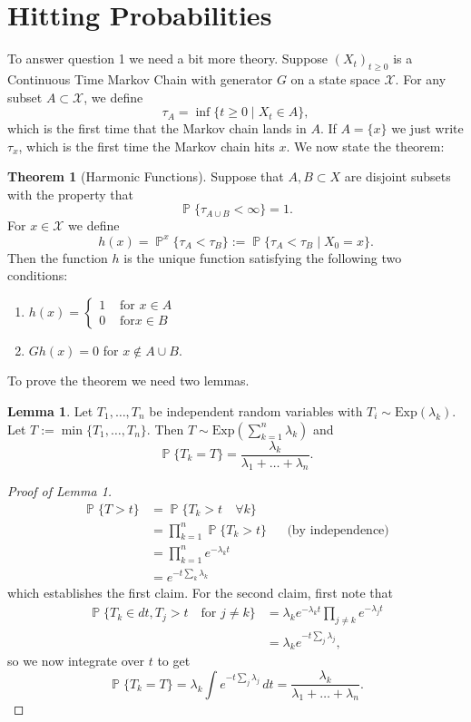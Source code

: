 \documentclass[../../../Master/AppliedStochastics.tex]{subfiles}
\theoremstyle{definition}
\newtheorem{lem}{Lemma}
\newtheorem{thm}{Theorem}
\DeclareMathOperator{\p}{\mathbb{P}}
\newcommand{\lr}[1]{\left(#1\right)}
\begin{document}
\section*{Hitting Probabilities} To answer question 1 we need a bit more theory. Suppose $(X_t)_{t\geq 0}$ is a Continuous Time Markov Chain with generator $G$ on a state space $\mathcal{X}$. For any subset $A \subset \mathcal{X}$, we define
\[
	\tau_A = \inf\{t\geq 0 \mid X_t \in A\},
\]
which is the first time that the Markov chain lands in $A$. If $A=\{x\}$ we just write $\tau_x$, which is the first time the Markov chain hits $x$. 
We now state the theorem:
\begin{thm}[Harmonic Functions] Suppose that $A,B\subset X$ are disjoint subsets with the property that 
\[
	\p\{ \tau_{A\cup B} <\infty\} = 1.
\]
For $x\in \mathcal{X}$ we define 
\[
	h(x) = \p^x \{\tau_A <\tau_B\} := \p\{\tau_A<\tau_B \mid X_0 = x\}.
\]
Then the function $h$ is the unique function satisfying the following two conditions:
\begin{enumerate}
	\item $
		h(x) = \begin{cases}
			1 & \text{ for } x \in A\\
			0 & \text{ for} x\in B
		\end{cases}
	$
	\item $Gh(x) = 0$ for $x\notin A\cup B$. 
\end{enumerate}
\end{thm}

To prove the theorem we need two lemmas.
\begin{lem}
Let $T_1,\dots, T_n$ be independent random variables with $T_i\sim \text{Exp}(\lambda_k)$. Let $T := \min\{T_1,\dots,T_n\}$. Then $T\sim \text{Exp}\lr{\sum_{k=1}^n \lambda_k}$ and 
\[
	\p\{T_k = T\} = \frac{\lambda_k}{\lambda_1+\dots+\lambda_n}.
\]
\end{lem}

\begin{proof}[Proof of Lemma 1]
	\begin{align*}
		\p\{T >t \} &= \p\{T_k > t \quad \forall k\}\\
		&= \prod_{k=1}^n \p\{T_k > t\} &&\text{(by independence)}\\
		&= \prod_{k=1}^n e^{-\lambda_k t} \\
		&= e^{-t \sum_{k}\lambda_k}
	\end{align*}
	which establishes the first claim. For the second claim, first note that
	\begin{align*}
		\p\{ T_k \in dt, T_j > t \quad \text{for } j\neq k\} &= \lambda_k e^{-\lambda_k t} \prod_{j\neq k} e^{-\lambda_j t}\\
		&= \lambda_k e^{-t \sum_j \lambda_j},
	\end{align*}
	so we now integrate over $t$ to get
	\[
		\p\{T_k = T\} = \lambda_k \int e^{-t \sum_j \lambda_j}\,dt = \frac{\lambda_k}{\lambda_1+\dots + \lambda_n}.
	\]
\end{proof}
\end{document}
